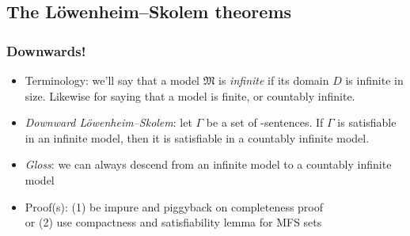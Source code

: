 \subsection{The L{\"o}wenheim--Skolem theorems}

\begin{frame}
\frametitle{Downwards!}

\begin{itemize}[<+->]

\item Terminology: we'll say that a model $\mathfrak{M}$ is \textit{infinite} if its domain $D$ is infinite in size. Likewise for saying that a model is finite, or countably infinite.

\item \emph{Downward L{\"o}wenheim--Skolem}: let $\Gamma$ be a set of -sentences. If $\Gamma$ is satisfiable in an infinite model, then it is satisfiable in a countably infinite model.

\item \textit{Gloss}: we can always descend from an infinite model to a countably infinite model

\item Proof(s): (1) be impure and piggyback on completeness proof \\ or (2) use compactness and satisfiability lemma for MFS sets



\end{itemize}
\end{frame}

